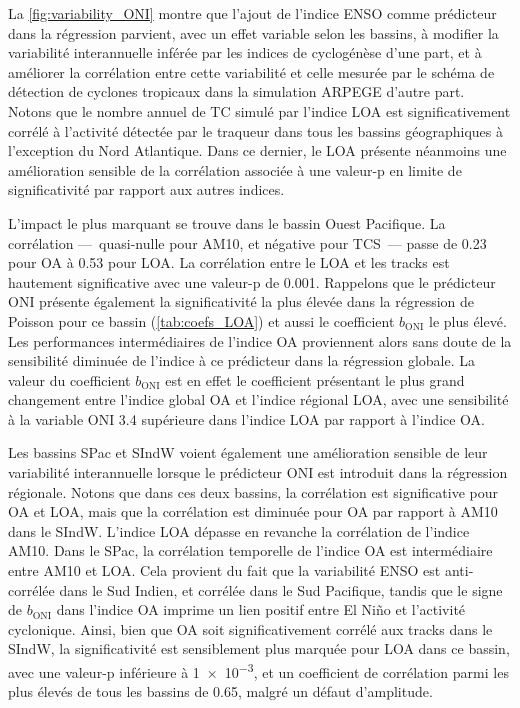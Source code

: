 \documentclass[../main.tex]{subfiles}
\begin{document}
La \cref{fig:variability_ONI} montre que l'ajout de l'indice ENSO comme prédicteur dans la régression parvient, avec un effet variable selon les bassins, à
modifier la variabilité interannuelle inférée par les indices de cyclogénèse d'une part, et à améliorer la corrélation entre cette variabilité et celle mesurée
par le schéma de détection de cyclones tropicaux dans la simulation ARPEGE d'autre part. Notons que le nombre annuel de TC simulé par l'indice LOA est significativement
corrélé à l'activité détectée par le traqueur dans tous les bassins géographiques à l'exception du Nord Atlantique. Dans ce dernier, le LOA présente néanmoins
une amélioration sensible de la corrélation associée à une valeur-p en limite de significativité par rapport aux autres indices.

L'impact le plus marquant se trouve dans le bassin Ouest Pacifique. La corrélation ---~quasi-nulle pour AM10, et négative pour TCS~--- passe de \num{0.23} pour
OA à \num{0.53} pour LOA. La corrélation entre le LOA et les tracks est hautement significative avec une valeur-p de \num{0.001}. Rappelons que le prédicteur
ONI présente également la significativité la plus élevée dans la régression de Poisson pour ce bassin (\cref{tab:coefs_LOA}) et aussi le coefficient
$b_{\mathrm{ONI}}$ le plus élevé. Les performances intermédiaires de l'indice OA proviennent alors sans doute de la sensibilité diminuée de l'indice à ce
prédicteur dans la régression globale. La valeur du coefficient $b_{\mathrm{ONI}}$ est en effet le coefficient présentant le plus grand changement entre
l'indice global OA et l'indice régional LOA, avec une sensibilité à la variable ONI \num{3.4} supérieure dans l'indice LOA par rapport à l'indice OA.

Les bassins SPac et SIndW voient également une amélioration sensible de leur variabilité interannuelle lorsque le prédicteur ONI est introduit dans la
régression régionale. Notons que dans ces deux bassins, la corrélation est significative pour OA et LOA, mais que la corrélation est diminuée pour OA par
rapport à AM10 dans le SIndW. L'indice LOA dépasse en revanche la corrélation de l'indice AM10. Dans le SPac, la corrélation temporelle de l'indice OA est
intermédiaire entre AM10 et LOA. Cela provient du fait que la variabilité ENSO est anti-corrélée dans le Sud Indien, et corrélée dans le Sud Pacifique, tandis
que le signe de $b_{\mathrm{ONI}}$ dans l'indice OA imprime un lien positif entre El Niño et l'activité cyclonique. Ainsi, bien que OA soit significativement
corrélé aux tracks dans le SIndW, la significativité est sensiblement plus marquée pour LOA dans ce bassin, avec une valeur-p inférieure à \num{1e-3}, et un
coefficient de corrélation parmi les plus élevés de tous les bassins de \num{0.65}, malgré un défaut d'amplitude.
\end{document}
